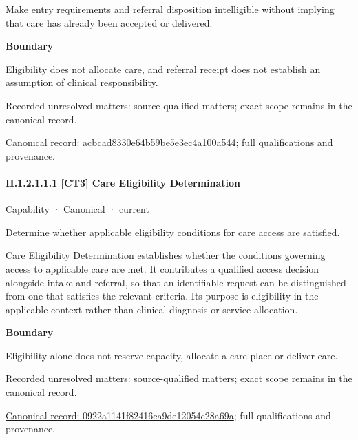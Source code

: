 Make entry requirements and referral disposition intelligible without implying that care has already been accepted or delivered.



\textbf{Boundary}



Eligibility does not allocate care, and referral receipt does not establish an assumption of clinical responsibility.


{\small Recorded unresolved matters: source-qualified matters; exact scope remains in the canonical record.}\par
{\footnotesize \href{../../../../continuum/strategy/capability/acbcad8330e64b59be5e3ec4a100a544.md}{Canonical record: acbcad8330e64b59be5e3ec4a100a544}; full qualifications and provenance.}\par
\paragraph*{II.1.2.1.1.1 [CT3] Care Eligibility Determination}
\label{navigation:II.1.2.1.1.1}

\label{element:0922a1141f82416ca9de12054c28a69a}
{\small Capability · Canonical · current}\par

Determine whether applicable eligibility conditions for care access are satisfied.



Care Eligibility Determination establishes whether the conditions governing access to applicable care are met. It contributes a qualified access decision alongside intake and referral, so that an identifiable request can be distinguished from one that satisfies the relevant criteria. Its purpose is eligibility in the applicable context rather than clinical diagnosis or service allocation.



\textbf{Boundary}



Eligibility alone does not reserve capacity, allocate a care place or deliver care.


{\small Recorded unresolved matters: source-qualified matters; exact scope remains in the canonical record.}\par
{\footnotesize \href{../../../../continuum/strategy/capability/0922a1141f82416ca9de12054c28a69a.md}{Canonical record: 0922a1141f82416ca9de12054c28a69a}; full qualifications and provenance.}\par
